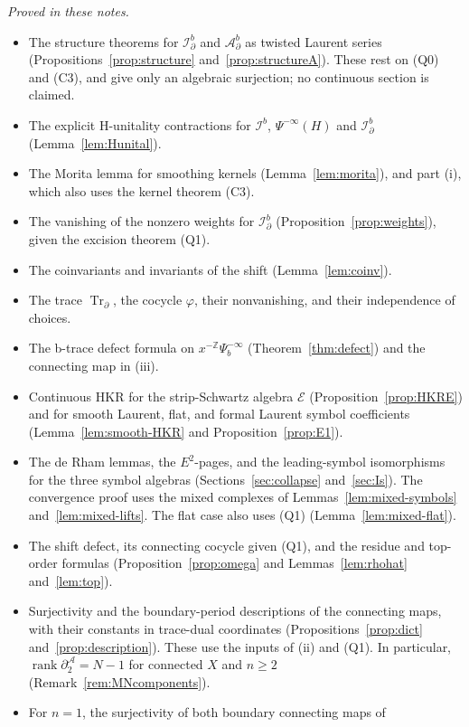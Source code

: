 \documentclass[11pt,oneside,reqno]{article}
\newcommand{\Z}{\mathbb Z}
\DeclareMathOperator{\Tr}{Tr}
\newcommand{\cE}{\mathcal E}
\newcommand{\Ib}{\mathcal I^b}
\newcommand{\Idb}{\mathcal I^b_\partial}
\newcommand{\Adb}{\mathcal A^b_\partial}
\theoremstyle{plain}
\theoremstyle{definition}
\theoremstyle{remark}
\begin{document}
\emph{Proved in these notes.}
\begin{itemize}
\item The structure theorems for \(\Idb\) and \(\Adb\) as twisted Laurent
series (Propositions~\ref{prop:structure} and~\ref{prop:structureA}).
These rest on (Q0) and (C3), and give only an algebraic surjection; no
continuous section is claimed.
\item The explicit H-unitality contractions for \(\Ib\),
\(\Psi^{-\infty}(H)\) and \(\Idb\) (Lemma~\ref{lem:Hunital}).
\item The Morita lemma for smoothing kernels (Lemma~\ref{lem:morita}), and
part (i), which also uses the kernel theorem (C3).
\item The vanishing of the nonzero weights for \(\Idb\)
(Proposition~\ref{prop:weights}), given the excision theorem (Q1).
\item The coinvariants and invariants of the shift (Lemma~\ref{lem:coinv}).
\item The trace \(\Tr_\partial\), the cocycle \(\varphi\), their
nonvanishing, and their independence of choices.
\item The b-trace defect formula on \(x^{-\Z}\Psi_b^{-\infty}\)
(Theorem~\ref{thm:defect}) and the connecting map in (iii).
\item Continuous HKR for the strip-Schwartz algebra \(\cE\)
(Proposition~\ref{prop:HKRE}) and for smooth Laurent, flat, and formal
Laurent symbol coefficients (Lemma~\ref{lem:smooth-HKR}
and Proposition~\ref{prop:E1}).
\item The de Rham lemmas, the \(E^2\)-pages, and the leading-symbol
isomorphisms for the three symbol algebras
(Sections~\ref{sec:collapse} and~\ref{sec:Is}). The convergence proof
uses the mixed complexes of Lemmas~\ref{lem:mixed-symbols}
and~\ref{lem:mixed-lifts}. The flat case also uses (Q1)
(Lemma~\ref{lem:mixed-flat}).
\item The shift defect, its connecting cocycle given (Q1), and the
residue and top-order formulas (Proposition~\ref{prop:omega} and
Lemmas~\ref{lem:rhohat} and~\ref{lem:top}).
\item Surjectivity and the boundary-period descriptions of the connecting
maps, with their constants in trace-dual coordinates
(Propositions~\ref{prop:dict} and~\ref{prop:description}). These use
the inputs of (ii) and (Q1). In particular,
\(\operatorname{rank}\partial^{\mathcal A}_2=N-1\) for connected
\(X\) and \(n\geq2\) (Remark~\ref{rem:MNcomponents}).
\item For \(n=1\), the surjectivity of both boundary connecting maps of

\end{itemize}
\end{document}
